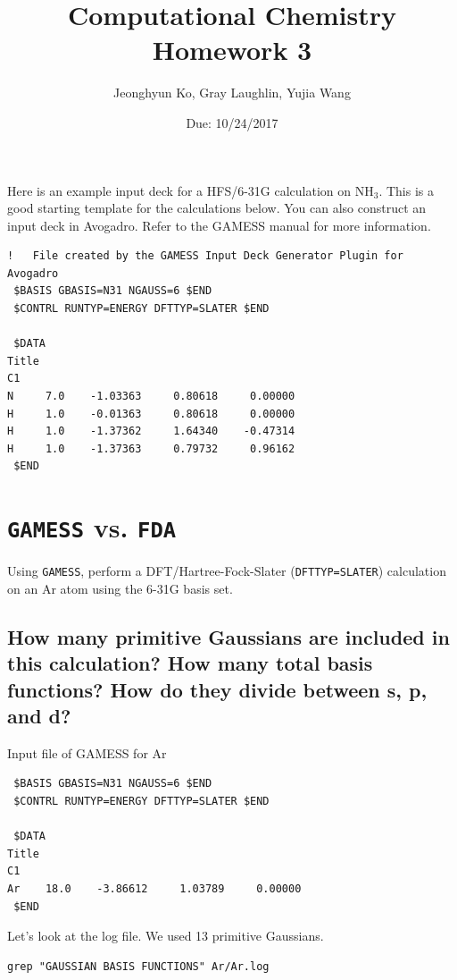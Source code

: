 \documentclass[11pt]{article}
\date{Due: 10/24/2017}
\title{}
\begin{document}
\title{Computational Chemistry Homework 3}
\author{Jeonghyun Ko, Gray Laughlin, Yujia Wang}
\maketitle


Here is an example input deck for a HFS/6-31G calculation on NH\(_{\text{3}}\). This is a good starting template for the calculations below. You can also construct an input deck in Avogadro. Refer to the GAMESS manual for more information.

\begin{verbatim}
!   File created by the GAMESS Input Deck Generator Plugin for Avogadro
 $BASIS GBASIS=N31 NGAUSS=6 $END
 $CONTRL RUNTYP=ENERGY DFTTYP=SLATER $END

 $DATA 
Title
C1
N     7.0    -1.03363     0.80618     0.00000
H     1.0    -0.01363     0.80618     0.00000
H     1.0    -1.37362     1.64340    -0.47314
H     1.0    -1.37363     0.79732     0.96162
 $END
\end{verbatim}


\section{\texttt{GAMESS} vs. \texttt{FDA}}
\label{sec:orgfde3668}

Using \texttt{GAMESS}, perform a DFT/Hartree-Fock-Slater (\texttt{DFTTYP=SLATER}) calculation on an Ar atom using the 6-31G basis set.

\subsection{How many primitive Gaussians are included in this calculation? How many total basis functions? How do they divide between s, p, and d?}
\label{sec:orgd5d4049}

Input file of GAMESS for Ar 
\begin{verbatim}
 $BASIS GBASIS=N31 NGAUSS=6 $END
 $CONTRL RUNTYP=ENERGY DFTTYP=SLATER $END

 $DATA 
Title
C1
Ar    18.0    -3.86612     1.03789     0.00000
 $END
\end{verbatim}

Let's look at the log file. We used 13 primitive Gaussians.
\begin{verbatim}
grep "GAUSSIAN BASIS FUNCTIONS" Ar/Ar.log
\end{verbatim}
\end{document}
